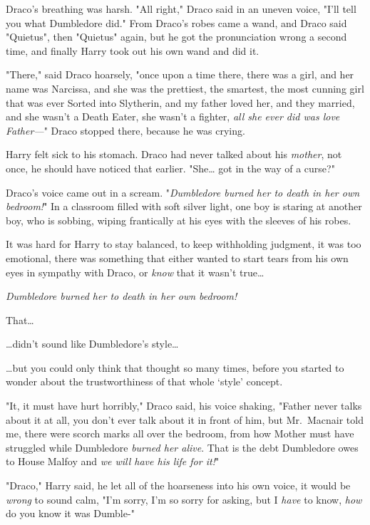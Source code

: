 Draco's breathing was harsh. "All right," Draco said in an uneven voice, "I'll 
tell you what Dumbledore did." From Draco's robes came a wand, and Draco said 
"Quietus", then "Quietus" again, but he got the pronunciation wrong a second 
time, and finally Harry took out his own wand and did it.

"There," said Draco hoarsely, "once upon a time there, there was a girl, and 
her name was Narcissa, and she was the prettiest, the smartest, the most 
cunning girl that was ever Sorted into Slytherin, and my father loved her, and 
they married, and she wasn't a Death Eater, she wasn't a fighter, \emph{all she 
ever did was love Father---}" Draco stopped there, because he was crying.

Harry felt sick to his stomach. Draco had never talked about his \emph{mother}, 
not once, he should have noticed that earlier. "She{\ldots} got in the way of a 
curse?"

Draco's voice came out in a scream. "\emph{Dumbledore burned her to death in 
her own bedroom!}"
\sbreak
In a classroom filled with soft silver light, one boy is staring at another 
boy, who is sobbing, wiping frantically at his eyes with the sleeves of his 
robes.

It was hard for Harry to stay balanced, to keep withholding judgment, it was 
too emotional, there was something that either wanted to start tears from his 
own eyes in sympathy with Draco, or \emph{know} that it wasn't true{\ldots}

\emph{Dumbledore burned her to death in her own bedroom!}

That{\ldots}

{\ldots}didn't sound like Dumbledore's style{\ldots}

{\ldots}but you could only think that thought so many times, before you started 
to wonder about the trustworthiness of that whole `style' concept.

"It, it must have hurt horribly," Draco said, his voice shaking, "Father never 
talks about it at all, you don't ever talk about it in front of him, but 
Mr.~Macnair told me, there were scorch marks all over the bedroom, from how 
Mother must have struggled while Dumbledore \emph{burned her alive}. That is 
the debt Dumbledore owes to House Malfoy and \emph{we will have his life for 
it!}"

"Draco," Harry said, he let all of the hoarseness into his own voice, it would 
be \emph{wrong} to sound calm, "I'm sorry, I'm so sorry for asking, but I 
\emph{have} to know, \emph{how} do you know it was Dumble-"

